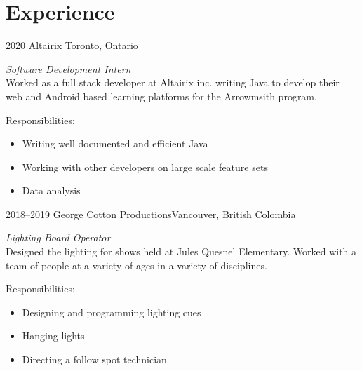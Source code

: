 \documentclass[]{style}
\begin{document}

\section{Experience}

\begin{entrylist}


\entry
{2020}
{\href{https://www.altairix.com/}{Altairix}}
{Toronto, Ontario}
{\emph{Software Development Intern} \\
Worked as a full stack developer at Altairix inc. writing Java to develop their web and Android based learning platforms for the Arrowmsith program.

Responsibilities:

\begin{itemize}
	\item Writing well documented and efficient Java
	\item Working with other developers on large scale feature sets
	\item Data analysis
\end{itemize}}


\entry
{2018–2019}
{George Cotton Productions}{Vancouver, British Colombia}
{\emph{Lighting Board Operator} \\
Designed the lighting for shows held at Jules Quesnel Elementary. Worked with a team of people at a variety of ages in a variety of disciplines.

Responsibilities:

\begin{itemize}
	\item Designing and programming lighting cues
	\item Hanging lights
	\item Directing a follow spot technician
\end{itemize}}


\end{entrylist}


\end{document}

